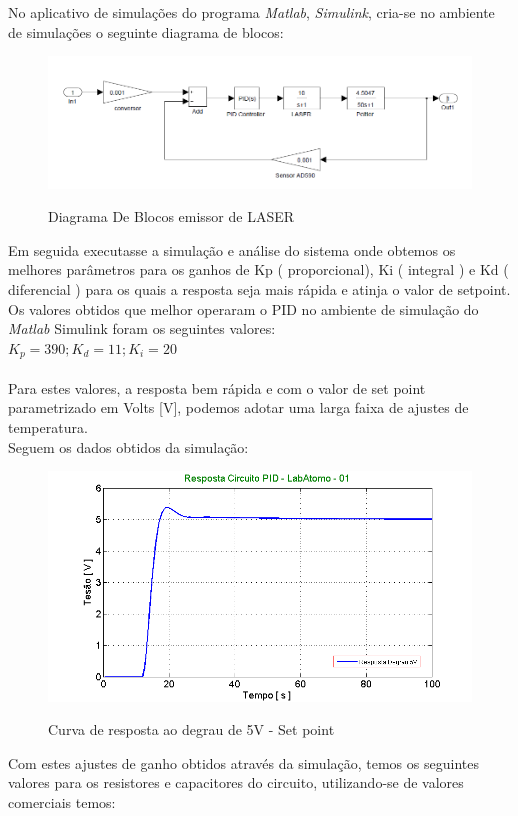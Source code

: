 No aplicativo de simulações do programa \emph{Matlab\tiny\textregistered}, \emph{Simulink}, cria-se no ambiente de simulações o seguinte diagrama de blocos:\\
\begin{figure}[H]
		\centering
		\includegraphics[width=0.8\linewidth]{./ima/PID-Final01.png}
		\label{fig:Ensaio1}
		\caption{Diagrama De Blocos emissor de LASER}
	\end{figure}
	
Em seguida executasse a simulação e análise do sistema onde obtemos os melhores parâmetros para os ganhos de Kp ( proporcional), Ki ( integral ) e Kd ( diferencial ) para os quais a resposta seja mais rápida e atinja o valor de setpoint.\\
Os valores obtidos que melhor operaram o PID no ambiente de simulação do \emph{Matlab\tiny\textregistered} Simulink foram os seguintes valores:\\
\textbf{$K_{p}= 390;  K_{d}= 11;  K_{i}= 20$} \\
\paragraph{}
Para estes valores, a resposta bem rápida e com o valor de set point parametrizado em Volts [V], podemos adotar uma larga faixa de ajustes de temperatura.\\
Seguem os dados obtidos da simulação:\\ 

\begin{figure}[H]
		\centering
		\includegraphics[width=0.7\linewidth]{./ima/LabAtomo01.png}
		\label{fig:simulinkA1}
		\caption{Curva de resposta ao degrau de 5V - Set point}
	\end{figure}
Com estes ajustes de ganho obtidos através da simulação, temos os seguintes valores para os resistores e capacitores do circuito, utilizando-se de valores comerciais temos:\\

